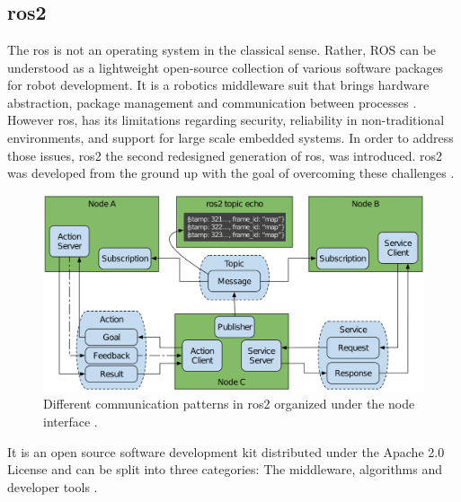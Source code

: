 \chapter{}
\label{sec:background}

\section{\gls{ros2}}
The \acrfull{ros} is not an operating system in the classical sense. Rather, ROS can be understood as a lightweight open-source collection of various software packages for robot development. It is a robotics middleware suit that brings hardware abstraction, package management and communication between processes \cite{quigley_ros_nodate, noauthor_ros_nodate}.\newline
However \gls{ros}, has its limitations regarding security, reliability in non-traditional environments, and support for large scale embedded systems. In order to address those issues, \gls{ros2} the second redesigned generation of \gls{ros}, was introduced. \gls{ros2} was developed from the ground up with the goal of overcoming these challenges \cite{rico_concise_2022, macenski_robot_2022, liao_introduction_2020}.
\begin{figure}[htbp]
	\centering
	\includegraphics[width=1\textwidth]{Figures/c3/ros2_node_interfaces.png}
	\caption{Different communication patterns in \gls{ros2} organized under the \gls{node} interface \cite{macenski_robot_2022}.}
	\label{c3_fig_ros2_node_interfaces}
\end{figure}
It is an open source software development kit distributed under the Apache 2.0 License and can be split into three categories: The middleware, algorithms and developer tools \cite{macenski_robot_2022}. 
